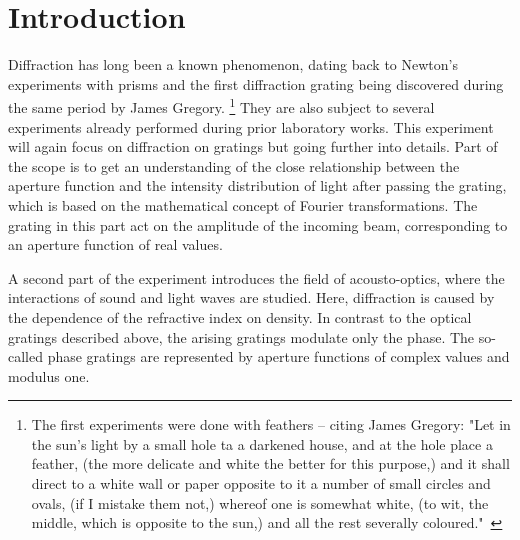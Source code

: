 \section{Introduction}

Diffraction has long been a known phenomenon, dating back to Newton's 
experiments with prisms and the first diffraction grating being discovered 
during the same period by James Gregory.%
\footnote{%
The first experiments were done with feathers -- citing James Gregory:
"Let in the sun's light by a small hole ta a darkened house, and at the hole place 
a feather, (the more delicate and white the better for this purpose,) 
and it shall direct to a white wall or paper opposite to it a number of small circles 
and ovals, (if I mistake them not,) whereof one is somewhat white, 
(to wit, the middle, which is opposite to the sun,) 
and all the rest severally coloured."~\cite{rigaud1841correspondence}
}%
They are also subject to several experiments already performed during 
prior laboratory works. This experiment will again focus on diffraction 
on gratings but going further into details. Part of the scope is to 
get an understanding of the close relationship between the aperture function 
and the intensity distribution of light after passing the grating, 
which is based on the mathematical concept of Fourier transformations. 
The grating in this part act on the amplitude of the incoming beam, 
corresponding to an aperture function of real values.

A second part of the experiment introduces the field of acousto-optics, 
where the interactions of sound and light waves are studied. Here, 
diffraction is caused by the dependence of the refractive index on 
density. In contrast to the optical gratings described above, 
the arising gratings modulate only the phase. The so-called phase gratings
are represented by aperture functions of complex values and 
modulus one. 


